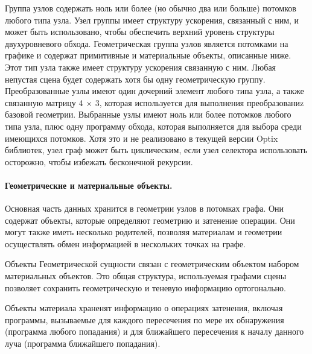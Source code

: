 Группа узлов содержать ноль или более (но обычно два или больше) потомков любого типа узла.
Узел группы имеет структуру ускорения, связанный с ним, и может быть использовано, чтобы обеспечить верхний уровень структуры двухуровневого обхода.
Геометрическая группа узлов является потомками на графике и содержат примитивные и материальные объекты, описанные ниже.
Этот тип узла также имеет структуру ускорения связанную с ним.
Любая непустая сцена будет содержать хотя бы одну геометрическую группу.
Преобразованные узлы имеют один дочерний элемент любого типа узла, а также связанную матрицу 4 × 3, которая используется для выполнения преобразованиz базовой геометрии.
Выбранные узлы имеют ноль или более потомков любого типа узла, плюс одну программу обхода, которая выполняется для выбора среди имеющихся потомков.
Хотя это и не реализовано в текущей версии Optix библиотек, узел граф может быть циклическим, если узел селектора использовать осторожно, чтобы избежать бесконечной рекурсии.

\paragraph{ Геометрические и материальные объекты.}

Основная часть данных хранится в геометрии узлов в потомках графа.
Они содержат объекты, которые определяют геометрию и затенение операции.
Они могут также иметь несколько родителей, позволяя материалам и геометрии осуществлять обмен информацией в нескольких точках на графе.

Объекты Геометрической сущности связан с геометрическим объектом набором материальных объектов.
Это общая структура, используемая графами сцены позволяет сохранить геометрическую и теневую информацию ортогонально.

Объекты материала храненят информацию о операциях затенения, включая программы, вызываемые для каждого пересечения по мере их обнаружения (программа любого попадания) и для ближайшего пересечения к началу данного луча (программа ближайшего попадания).

